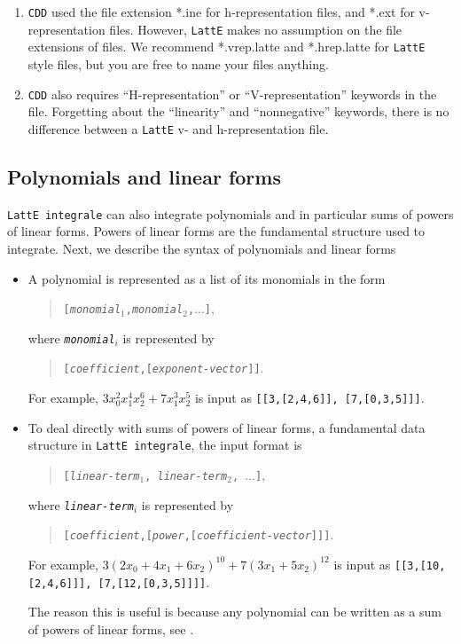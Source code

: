 \documentclass{article}
\newcommand{\latte}{{\tt LattE}\xspace}
\newcommand{\latteInt}{{\tt LattE integrale}\xspace}
\newcommand{\cdd}{{\tt CDD}\xspace}
\begin{document}
\begin{enumerate}
	\item \cdd used the file extension *.ine for h-representation files, and *.ext for v-representation files. However, \latte makes no assumption on the file extensions of files. We recommend *.vrep.latte and *.hrep.latte for \latte style files, but you are free to name your files anything.
	\item \cdd also requires ``H-representation'' or ``V-representation'' keywords in the file. Forgetting about the ``linearity'' and ``nonnegative'' keywords, there is no difference between a \latte v- and h-representation file.
\end{enumerate}


\subsection{Polynomials and linear forms}
\label{input-file:polynomial-and-linear-form}

\latteInt can also integrate polynomials and in particular sums of powers of linear forms. Powers of linear forms are the fundamental structure used to integrate. Next, we describe the syntax of polynomials and linear forms

\begin{itemize}
\item A polynomial is represented as a list of its monomials in the form
  \begin{quote}
    \texttt{[{\itshape monomial}$_1$,{\itshape monomial}$_2$,$\dots$]},
  \end{quote}
  where \texttt{{\itshape monomial}$_i$} is represented by
  \begin{quote}
    \texttt{[{\itshape coefficient},[{\itshape exponent-vector}]]}.
  \end{quote}
  For example, $3x_0^2x_1^4x_2^6 + 7x_1^3x_2^5$ is input as \texttt{[[3,[2,4,6]], [7,[0,3,5]]]}. 

\item To deal directly with sums of powers of linear forms, a fundamental data structure in \latteInt, the input format is 
  \begin{quote}
    \texttt{[{\itshape linear-term$_1$}, {\itshape linear-term$_2$}, $\dots$]},
    \end{quote}
    where \texttt{{\itshape linear-term}$_i$} is represented by
    \begin{quote}
      \texttt{[{\itshape coefficient},[{\itshape power},[{\itshape coefficient-vector}]]]}.
    \end{quote}
    For example, $3(2x_0 + 4x_1 + 6x_2)^{10} + 7(3x_1 + 5x_2)^{12}$ is input
    as \texttt{[[3,[10,[2,4,6]]], [7,[12,[0,3,5]]]]}. 


The reason this is useful is because any polynomial can be written as a sum of powers of linear forms, see \cite{howToIntegratePolynomialSimplex}.


\end{itemize}
\end{document}

